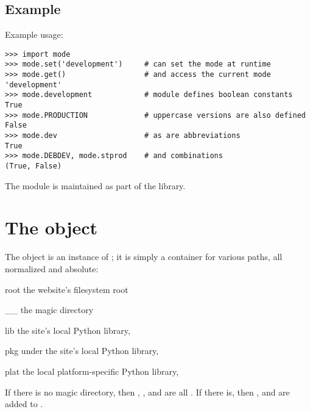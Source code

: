 \subsection{Example}

Example usage:

\begin{verbatim}
>>> import mode
>>> mode.set('development')     # can set the mode at runtime
>>> mode.get()                  # and access the current mode
'development'
>>> mode.development            # module defines boolean constants
True
>>> mode.PRODUCTION             # uppercase versions are also defined
False
>>> mode.dev                    # as are abbreviations
True
>>> mode.DEBDEV, mode.stprod    # and combinations
(True, False)
\end{verbatim}

\begin{seealso}

{}{The  module is maintained as part of the
 library.}

\end{seealso}


\section{The  object}
\label{api-paths}

The  object is an instance of
; it is simply a container for various paths,
all normalized and absolute:

\begin{memberdesc}[string]{root}
the website's filesystem root
\end{memberdesc}

\begin{memberdesc}[string]{__}
the magic directory
\end{memberdesc}

\begin{memberdesc}[string]{lib}
the site's local Python library, 
\end{memberdesc}

\begin{memberdesc}[string]{pkg}
 under the site's local Python library,
\end{memberdesc}

\begin{memberdesc}[string]{plat}
the local platform-specific Python library, 
\end{memberdesc}

If there is no magic directory, then \code{__}, ,  and
 are all . If there is, then ,  and
 are added to .
